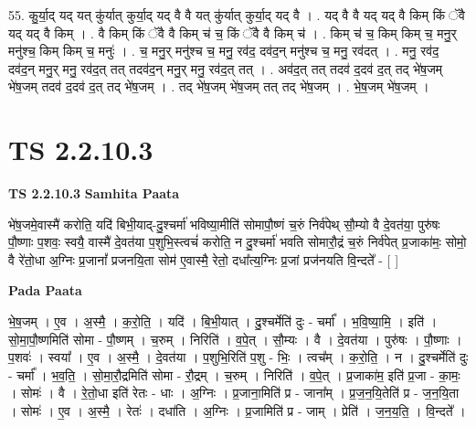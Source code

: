 \documentclass[17pt]{extarticle}
\begin{document}
55. कु॒र्या॒द् यद् यत् कु॑र्यात् कुर्या॒द् यद् वै वै यत् कु॑र्यात् कुर्या॒द् यद् वै । . यद् वै वै यद् यद् वै किम् किं ॅवै यद् यद् वै किम् । . वै किम् किं ॅवै वै किम् च॑ च॒ किं ॅवै वै किम् च॑ । . किम् च॑ च॒ किम् किम् च॒ मनु॒र् मनु॑श्च॒ किम् किम् च॒ मनुः॑ । . च॒ मनु॒र् मनु॑श्च च॒ मनु॒ रव॑द॒ दव॑द॒न् मनु॑श्च च॒ मनु॒ रव॑दत् । . मनु॒ रव॑द॒ दव॑द॒न् मनु॒र् मनु॒ रव॑द॒त् तत् तदव॑द॒न् मनु॒र् मनु॒ रव॑द॒त् तत् । . अव॑द॒त् तत् तदव॑ द॒दव॑ द॒त् तद् भे॑ष॒जम् भे॑ष॒जम् तदव॑ द॒दव॑ द॒त् तद् भे॑ष॒जम् । . तद् भे॑ष॒जम् भे॑ष॒जम् तत् तद् भे॑ष॒जम् । . भे॒ष॒जम् भे॑ष॒जम् । \newline
\pagebreak
{}

\section{ TS 2.2.10.3 }

\textbf{TS 2.2.10.3 } \newline
\textbf{Samhita Paata} \newline

भे॑ष॒जमे॒वास्मै॑ करोति॒ यदि॑ बिभी॒याद्-दु॒श्चर्मा॑ भविष्या॒मीति॑ सोमापौ॒ष्णं च॒रुं निर्व॑पेथ् सौ॒म्यो वै दे॒वत॑या॒ पुरु॑षः पौ॒ष्णाः प॒शवः॒ स्वयै॒ वास्मै॑ दे॒वत॑या प॒शुभि॒स्त्वचं॑ करोति॒ न दु॒श्चर्मा॑ भवति सोमारौ॒द्रं च॒रुं निर्व॑पेत् प्र॒जाका॑मः॒ सोमो॒ वै रे॑तो॒धा अ॒ग्निः प्र॒जानां᳚ प्रजनयि॒ता सोम॑ ए॒वास्मै॒ रेतो॒ दधा᳚त्य॒ग्निः प्र॒जां प्रज॑नयति वि॒न्दते᳚ - [  ] \newline

\textbf{Pada Paata} \newline

भे॒ष॒जम् । ए॒व । अ॒स्मै॒ । क॒रो॒ति॒ । यदि॑ । बि॒भी॒यात् । दु॒श्चर्मेति॑ दुः - चर्मा᳚ । भ॒वि॒ष्या॒मि॒ । इति॑ । सो॒मा॒पौ॒ष्णमिति॑ सोमा - पौ॒ष्णम् । च॒रुम् । निरिति॑ । व॒पे॒त् । सौ॒म्यः । वै । दे॒वत॑या । पुरु॑षः । पौ॒ष्णाः । प॒शवः॑ । स्वया᳚ । ए॒व । अ॒स्मै॒ । दे॒वत॑या । प॒शुभि॒रिति॑ प॒शु - भिः॒ । त्वच᳚म् । क॒रो॒ति॒ । न । दु॒श्चर्मेति॑ दुः - चर्मा᳚ । भ॒व॒ति॒ । सो॒मा॒रौ॒द्रमिति॑ सोमा - रौ॒द्रम् । च॒रुम् । निरिति॑ । व॒पे॒त् । प्र॒जाका॑म॒ इति॑ प्र॒जा - का॒मः॒ । सोमः॑ । वै । रे॒तो॒धा इति॑ रेतः - धाः । अ॒ग्निः । प्र॒जाना॒मिति॑ प्र - जाना᳚म् । प्र॒ज॒न॒यि॒तेति॑ प्र - ज॒न॒यि॒ता । सोमः॑ । ए॒व । अ॒स्मै॒ । रेतः॑ । दधा॑ति । अ॒ग्निः । प्र॒जामिति॑ प्र - जाम् । प्रेति॑ । ज॒न॒य॒ति॒ । वि॒न्दते᳚ ।  \newline
\end{document}
